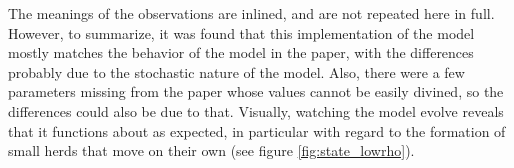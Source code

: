 \documentclass{article}
\begin{document}
The meanings of the observations are inlined, and are not repeated here in full.
However, to summarize, it was found that this implementation of the model mostly
matches the behavior of the model in the paper, with the differences probably
due to the stochastic nature of the model.  Also, there were a few parameters
missing from the paper whose values cannot be easily divined, so the differences
could also be due to that.  Visually, watching the model evolve reveals that it
functions about as expected, in particular with regard to the formation of small
herds that move on their own (see figure \ref{fig:state_lowrho}).
\end{document}
